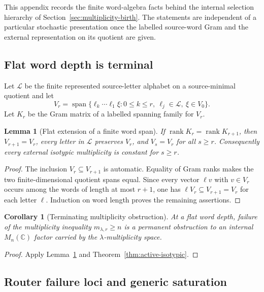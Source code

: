 \documentclass[11pt]{article}
\newtheorem{lemma}[theorem]{Lemma}
\newtheorem{corollary}[theorem]{Corollary}
\theoremstyle{definition}
\theoremstyle{remark}
\newcommand{\C}{\mathbb C}
\newcommand{\rank}{\operatorname{rank}}
\newcommand{\Span}{\operatorname{span}}
\begin{document}
This appendix records the finite word-algebra facts behind the internal
selection hierarchy of Section~\ref{sec:multiplicity-birth}.  The statements
are independent of a particular stochastic presentation once the labelled
source-word Gram and the external representation on its quotient are given.

\subsection{Flat word depth is terminal}

Let $\mathscr L$ be the finite represented source-letter alphabet on a
source-minimal quotient and let
\[
V_r=\Span\{\ell_k\cdots\ell_1\xi:
0\le k\le r,\ \ell_j\in\mathscr L,\ \xi\in V_0\}.
\]
Let $K_r$ be the Gram matrix of a labelled spanning family for $V_r$.

\begin{lemma}[Flat extension of a finite word span]
\label{lem:flat-word-span}
If $\rank K_r=\rank K_{r+1}$, then $V_{r+1}=V_r$, every letter in
$\mathscr L$ preserves $V_r$, and $V_s=V_r$ for all $s\ge r$.
Consequently every external isotypic multiplicity is constant for $s\ge r$.
\end{lemma}

\begin{proof}
The inclusion $V_r\subseteq V_{r+1}$ is automatic.  Equality of Gram ranks
makes the two finite-dimensional quotient spans equal.  Since every vector
$\ell v$ with $v\in V_r$ occurs among the words of length at most $r+1$, one
has $\ell V_r\subseteq V_{r+1}=V_r$ for each letter $\ell$.  Induction on word
length proves the remaining assertions.
\end{proof}

\begin{corollary}[Terminating multiplicity obstruction]
\label{cor:flat-multiplicity-obstruction}
At a flat word depth, failure of the multiplicity inequality
$m_{\lambda,r}\ge n$ is a permanent obstruction to an internal $M_n(\C)$
factor carried by the $\lambda$-multiplicity space.
\end{corollary}

\begin{proof}
Apply Lemma~\ref{lem:flat-word-span} and
Theorem~\ref{thm:active-isotypic}.
\end{proof}

\subsection{Router failure loci and generic saturation}
\end{document}
